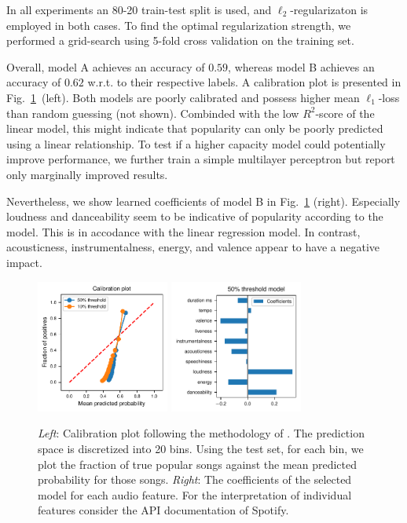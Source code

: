 \documentclass{article}
\begin{document}
In all experiments an 80-20 train-test split is used, and $\ell_2$-regularizaton is employed in both cases. To find the optimal regularization strength, we performed a grid-search using 5-fold cross validation on the training set.

Overall, model A achieves an accuracy of $0.59$, whereas model B achieves an accuracy of $0.62$ w.r.t. to their respective labels.
A calibration plot is presented in Fig.~\ref{fig:logis_eval}~(left). 
Both models are poorly calibrated and possess higher mean $\ell_1$-loss than random guessing (not shown). Combinded with the low $R^2$-score of the linear model, this might indicate that popularity can only be poorly predicted using a linear relationship. To test if a higher capacity model could potentially improve performance, we further train a simple multilayer perceptron but report only marginally improved results.

Nevertheless, we show learned coefficients of model B in Fig.~\ref{fig:logis_eval} (right). Especially loudness and danceability seem to be indicative of popularity according to the model. This is in accodance with the linear regression model. In contrast, acousticness, instrumentalness, energy, and valence appear to have a negative impact.

\begin{figure}
  \centering
  \includegraphics[width=0.39\textwidth]{../figures/calibration_combined.pdf}
  \qquad
  \includegraphics[width=0.39\textwidth]{../figures/logistic_coefs_50_threshold_model.pdf}
  \caption{\textit{Left}: Calibration plot following the methodology of \cite{niculescu-mizilPredictingGoodProbabilities2005}. The prediction space is discretized into \num{20} bins. Using the test set, for each bin, we plot the fraction of true popular songs against the mean predicted probability for those songs. \textit{Right}: The coefficients of the selected model for each audio feature. For the interpretation of individual features consider the API documentation of Spotify.}
  \label{fig:logis_eval}
\end{figure}
  
\end{document}
